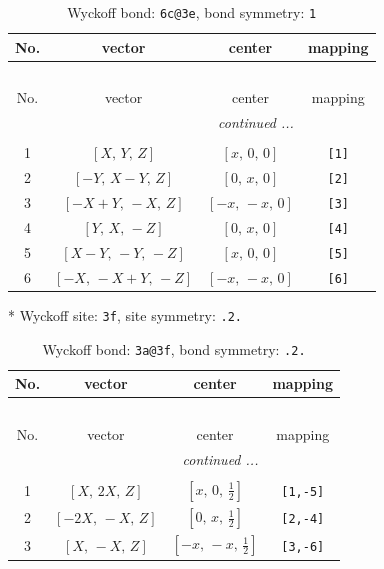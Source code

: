 \documentclass[fleqn,8pt]{jsarticle}
\begin{document}
\renewcommand{\arraystretch}{1.2}
\begin{longtable}{cccc}
\caption{Wyckoff bond: {\tt 6c@3e}, bond symmetry: {\tt 1}}
 \\
 \hline \hline
No. & vector & center & mapping \\ \hline \endfirsthead

\multicolumn{3}{l}{\tablename\ \thetable{}} \\
 \hline \hline
No. & vector & center & mapping \\ \hline \endhead

 \hline \hline
\multicolumn{3}{r}{\footnotesize\it continued ...} \\ \endfoot

 \hline \hline
\multicolumn{3}{r}{} \\ \endlastfoot

1 & $\left[ X,\, Y,\, Z \right]$ & $\left[ x,\, 0,\, 0 \right]$ & {\tt [1]} \\ \hline
2 & $\left[ - Y,\, X - Y,\, Z \right]$ & $\left[ 0,\, x,\, 0 \right]$ & {\tt [2]} \\ \hline
3 & $\left[ - X + Y,\, - X,\, Z \right]$ & $\left[ - x,\, - x,\, 0 \right]$ & {\tt [3]} \\ \hline
4 & $\left[ Y,\, X,\, - Z \right]$ & $\left[ 0,\, x,\, 0 \right]$ & {\tt [4]} \\ \hline
5 & $\left[ X - Y,\, - Y,\, - Z \right]$ & $\left[ x,\, 0,\, 0 \right]$ & {\tt [5]} \\ \hline
6 & $\left[ - X,\, - X + Y,\, - Z \right]$ & $\left[ - x,\, - x,\, 0 \right]$ & {\tt [6]} \\
\end{longtable}
* Wyckoff site: {\tt 3f}, site symmetry: {\tt .2.}
\renewcommand{\arraystretch}{1.2}
\begin{longtable}{cccc}
\caption{Wyckoff bond: {\tt 3a@3f}, bond symmetry: {\tt .2.}}
 \\
 \hline \hline
No. & vector & center & mapping \\ \hline \endfirsthead

\multicolumn{3}{l}{\tablename\ \thetable{}} \\
 \hline \hline
No. & vector & center & mapping \\ \hline \endhead

 \hline \hline
\multicolumn{3}{r}{\footnotesize\it continued ...} \\ \endfoot

 \hline \hline
\multicolumn{3}{r}{} \\ \endlastfoot

1 & $\left[ X,\, 2 X,\, Z \right]$ & $\left[ x,\, 0,\, \frac{1}{2} \right]$ & {\tt [1,-5]} \\ \hline
2 & $\left[ - 2 X,\, - X,\, Z \right]$ & $\left[ 0,\, x,\, \frac{1}{2} \right]$ & {\tt [2,-4]} \\ \hline
3 & $\left[ X,\, - X,\, Z \right]$ & $\left[ - x,\, - x,\, \frac{1}{2} \right]$ & {\tt [3,-6]} \\
\end{longtable}
\end{document}
